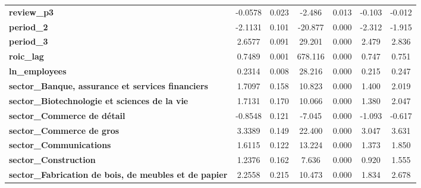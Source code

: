 \begin{center}
\begin{tabular}{lcccccc}
\textbf{review\_p3}                                                   &      -0.0578  &        0.023     &    -2.486  &         0.013        &       -0.103    &       -0.012     \\
\textbf{period\_2}                                                    &      -2.1131  &        0.101     &   -20.877  &         0.000        &       -2.312    &       -1.915     \\
\textbf{period\_3}                                                    &       2.6577  &        0.091     &    29.201  &         0.000        &        2.479    &        2.836     \\
\textbf{roic\_lag}                                                    &       0.7489  &        0.001     &   678.116  &         0.000        &        0.747    &        0.751     \\
\textbf{ln\_employees}                                                &       0.2314  &        0.008     &    28.216  &         0.000        &        0.215    &        0.247     \\
\textbf{sector\_Banque, assurance et services financiers}             &       1.7097  &        0.158     &    10.823  &         0.000        &        1.400    &        2.019     \\
\textbf{sector\_Biotechnologie et sciences de la vie}                 &       1.7131  &        0.170     &    10.066  &         0.000        &        1.380    &        2.047     \\
\textbf{sector\_Commerce de détail}                                   &      -0.8548  &        0.121     &    -7.045  &         0.000        &       -1.093    &       -0.617     \\
\textbf{sector\_Commerce de gros}                                     &       3.3389  &        0.149     &    22.400  &         0.000        &        3.047    &        3.631     \\
\textbf{sector\_Communications}                                       &       1.6115  &        0.122     &    13.224  &         0.000        &        1.373    &        1.850     \\
\textbf{sector\_Construction}                                         &       1.2376  &        0.162     &     7.636  &         0.000        &        0.920    &        1.555     \\
\textbf{sector\_Fabrication de bois, de meubles et de papier}         &       2.2558  &        0.215     &    10.473  &         0.000        &        1.834    &        2.678     \\

\end{tabular}
\end{center}
